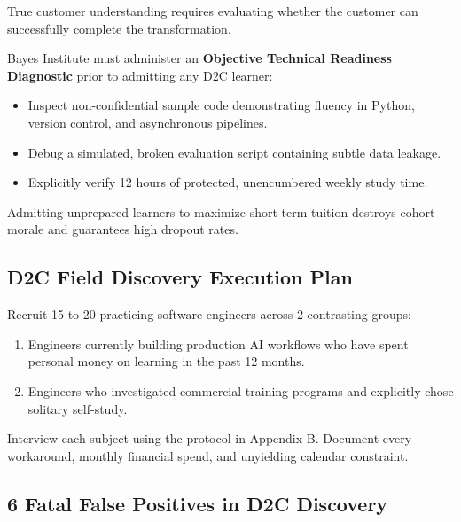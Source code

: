 True customer understanding requires evaluating whether the customer can successfully complete the transformation.

Bayes Institute must administer an \textbf{Objective Technical Readiness Diagnostic} prior to admitting any D2C learner:
\begin{itemize}[leftmargin=1.2em,itemsep=0.2ex]
  \item Inspect non-confidential sample code demonstrating fluency in Python, version control, and asynchronous pipelines.
  \item Debug a simulated, broken evaluation script containing subtle data leakage.
  \item Explicitly verify 12 hours of protected, unencumbered weekly study time.
\end{itemize}
Admitting unprepared learners to maximize short-term tuition destroys cohort morale and guarantees high dropout rates.

\subsection{D2C Field Discovery Execution Plan}

Recruit 15 to 20 practicing software engineers across 2 contrasting groups:
\begin{enumerate}[leftmargin=1.2em,itemsep=0.2ex]
  \item Engineers currently building production AI workflows who have spent personal money on learning in the past 12 months.
  \item Engineers who investigated commercial training programs and explicitly chose solitary self-study.
\end{enumerate}
Interview each subject using the protocol in Appendix B. Document every workaround, monthly financial spend, and unyielding calendar constraint.

\subsection{6 Fatal False Positives in D2C Discovery}

